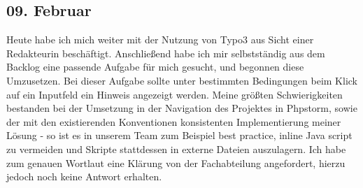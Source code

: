 \subsection{09. Februar}
Heute habe ich mich weiter mit der Nutzung von Typo3 aus Sicht einer Redakteurin beschäftigt. Anschließend habe ich mir selbstständig aus dem Backlog eine passende Aufgabe für mich gesucht, und begonnen diese Umzusetzen. Bei dieser Aufgabe sollte unter bestimmten Bedingungen beim Klick auf ein Inputfeld ein Hinweis angezeigt werden. Meine größten Schwierigkeiten bestanden bei der Umsetzung in der Navigation des Projektes in Phpstorm, sowie der mit den existierenden Konventionen konsistenten Implementierung meiner Lösung - so ist es in unserem Team zum Beispiel best practice, inline Java script zu vermeiden und Skripte stattdessen in externe Dateien auszulagern. Ich habe zum genauen Wortlaut eine Klärung von der Fachabteilung angefordert, hierzu jedoch noch keine Antwort erhalten.